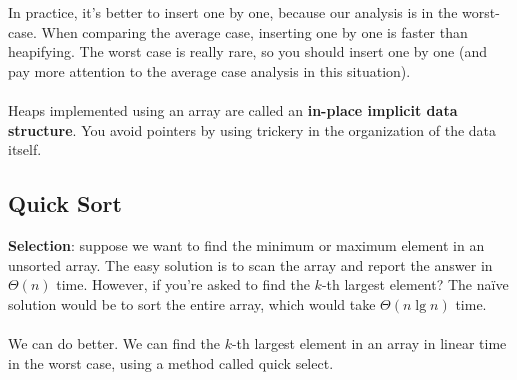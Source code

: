 \documentclass[]{article}
\theoremstyle{definition}
\begin{document}
			In practice, it's better to insert one by one, because our analysis is in the worst-case. When comparing the average case, inserting one by one is faster than heapifying. The worst case is really rare, so you should insert one by one (and pay more attention to the average case analysis in this situation).
			\\ \\
			Heaps implemented using an array are called an \textbf{in-place implicit data structure}. You avoid pointers by using trickery in the organization of the data itself.
		\subsection{Quick Sort}
			\textbf{Selection}: suppose we want to find the minimum or maximum element in an unsorted array. The easy solution is to scan the array and report the answer in $\Theta(n)$ time. However, if you're asked to find the $k$-th largest element? The na\"ive solution would be to sort the entire array, which would take $\Theta(n \lg n)$ time.
			\\ \\
			We can do better. We can find the $k$-th largest element in an array in linear time in the worst case, using a method called quick select.
\end{document}
